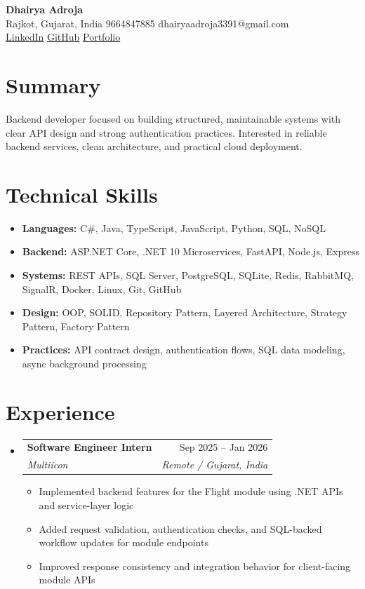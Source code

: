 \documentclass[11pt,a4paper]{article}
\makeatletter
\newcommand{\resumeSubheading}[4]{
  \vspace{-1pt}\item
    \begin{tabular*}{0.97\textwidth}[t]{l@{\extracolsep{\fill}}r}
      \textbf{#1} & #2 \\
      \textit{#3} & \textit{#4} \\
    \end{tabular*}\vspace{-3pt}
}
\newcommand{\resumeItem}[1]{
  \item\small{#1 \vspace{-1pt}}
}
\makeatother
\begin{document}
\begin{center}
    {\huge \textbf{Dhairya Adroja}} \\
    \vspace{8pt}
    \small Rajkot, Gujarat, India \textbar{} 9664847885 \textbar{} dhairyaadroja3391@gmail.com \\
    \small
    \href{https://www.linkedin.com/in/adrojadhairya}{LinkedIn} \textbar{}
    \href{https://www.github.com/Dhairya3391}{GitHub} \textbar{}
    \href{https://dhairya.codes}{Portfolio}
\end{center}

\section{Summary}
\noindent Backend developer focused on building structured, maintainable systems with clear API design and strong authentication practices. Interested in reliable backend services, clean architecture, and practical cloud deployment.

\section{Technical Skills}
\begin{itemize}[leftmargin=*]
  \resumeItem{\textbf{Languages:} C\#, Java, TypeScript, JavaScript, Python, SQL, NoSQL}
  \resumeItem{\textbf{Backend:} ASP.NET Core, .NET 10 Microservices, FastAPI, Node.js, Express}
  \resumeItem{\textbf{Systems:} REST APIs, SQL Server, PostgreSQL, SQLite, Redis, RabbitMQ, SignalR, Docker, Linux, Git, GitHub}
  \resumeItem{\textbf{Design:} OOP, SOLID, Repository Pattern, Layered Architecture, Strategy Pattern, Factory Pattern}
  \resumeItem{\textbf{Practices:} API contract design, authentication flows, SQL data modeling, async background processing}
\end{itemize}

\section{Experience}
\begin{itemize}[leftmargin=*]
\resumeSubheading
{Software Engineer Intern}{Sep 2025 -- Jan 2026}
{Multiicon}{Remote / Gujarat, India}
\begin{itemize}[leftmargin=*]
  \resumeItem{Implemented backend features for the Flight module using .NET APIs and service-layer logic}
  \resumeItem{Added request validation, authentication checks, and SQL-backed workflow updates for module endpoints}
  \resumeItem{Improved response consistency and integration behavior for client-facing module APIs}
\end{itemize}
\end{itemize}
\end{document}
